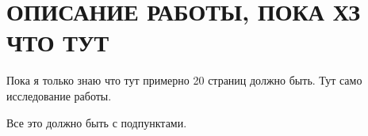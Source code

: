 \section{ОПИСАНИЕ РАБОТЫ, ПОКА ХЗ ЧТО ТУТ}

Пока я только знаю что тут примерно 20 страниц должно быть. Тут само исследование работы.

Все это должно быть с подпунктами.

\clearpage
